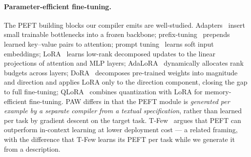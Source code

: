 \documentclass{article}
\theoremstyle{plain}
\theoremstyle{definition}
\theoremstyle{remark}
\begin{document}
\paragraph{Parameter-efficient fine-tuning.}
The PEFT building blocks our compiler emits are well-studied. Adapters~\citep{houlsby2019adapters,pfeiffer2021adapterfusion} insert small trainable bottlenecks into a frozen backbone; prefix-tuning~\citep{li-liang-2021-prefix} prepends learned key--value pairs to attention; prompt tuning~\citep{lester2021prompttuning,liu2022ptuningv2} learns soft input embeddings; LoRA~\citep{hu2022lora} learns low-rank decomposed updates to the linear projections of attention and MLP layers; AdaLoRA~\citep{zhang2023adalora} dynamically allocates rank budgets across layers; DoRA~\citep{liu2024dora} decomposes pre-trained weights into magnitude and direction and applies LoRA only to the direction component, closing the gap to full fine-tuning; QLoRA~\citep{dettmers2023qlora} combines quantization with LoRA for memory-efficient fine-tuning. PAW differs in that the PEFT module is \emph{generated per example by a separate compiler from a textual specification}, rather than learned per task by gradient descent on the target task. T-Few~\citep{liu2022tfew} argues that PEFT can outperform in-context learning at lower deployment cost --- a related framing, with the difference that T-Few learns its PEFT per task while we generate it from a description.

\end{document}
